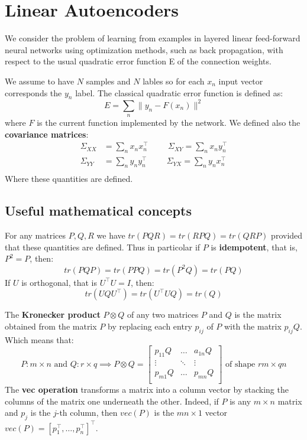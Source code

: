 \section{Linear Autoencoders}
We consider the problem of learning from examples in layered linear feed-forward neural networks using optimization methods, such as back propagation, with respect to the usual quadratic error function E of the connection weights. 

We assume to have $N$ samples and $N$ lables so for each $x_n$ input vector corresponds the $y_n$ label. The classical quadratic error function is defined as:
\[
E = \sum_n \|y_n - F(x_n)\|^2 
\]
where $F$ is the current function implemented by the network. We defined also the \textbf{covariance matrices}:
\[
\begin{split}
    \Sigma_{XX} &= \sum_n x_n x_n^\intercal \hspace{1cm} \Sigma_{XY} = \sum_n x_n y_n^\intercal\\
    \Sigma_{YY} &= \sum_n y_n y_n^\intercal \hspace{1cm} \Sigma_{YX} = \sum_n y_n x_n^\intercal\\
\end{split}
\]
Where these quantities are defined. 

\subsection{Useful mathematical concepts}
For any matrices $P, Q, R$ we have $tr(PQR) = tr(RPQ) = tr(QRP)$ provided that these quantities are defined. Thus in particolar if $P$ is \textbf{idempotent}, that is, $P^2 = P$, then:
\begin{equation}\tag{a}
    tr(PQP) = tr(PPQ) = tr(P^2Q) = tr(PQ)
\end{equation}
If $U$ is orthogonal, that is $U^\intercal U = I$, then:
\begin{equation}\tag{b}
    tr(UQU^\intercal) = tr(U^\intercal UQ) = tr(Q)
\end{equation}

The \textbf{Kronecker product} $P \otimes Q$ of any two matrices $P$ and $Q$ is the matrix obtained from the matrix $P$ by replacing each entry $p_{ij}$ of $P$ with the matrix $p_{ij}Q$. Which means that:
\[P: m\times n \text{ and } Q:r\times q \implies 
P \otimes Q = \begin{bmatrix}
    p_{11}Q & \dots & a_{1n}Q\\
    \vdots & \ddots & \vdots\\
    p_{m1}Q & \dots & p_{mn}Q\\
\end{bmatrix}
\text{ of shape } rm\times qn
\]
The \textbf{vec operation} transforms a matrix into a column vector by stacking the columns of the matrix one underneath the other. Indeed, if $P$ is any $m \times n$ matrix and $p_j$ is the $j$-th column, then $vec(P)$ is the $mn\times 1$ vector $vec(P) = [p_1^\intercal, \dots, p_n^\intercal]^\intercal$.

